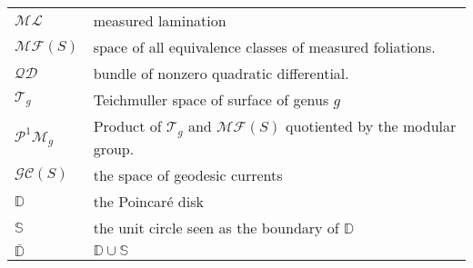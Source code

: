 \begin{tabular}{ll}
  $\mathcal{ML}$ &  measured lamination  \\
  $\mathcal{MF}(S)$ & space of all equivalence classes of measured foliations. \\
  $\mathcal{QD}$ & bundle of nonzero quadratic differential. \\
  $\mathcal{T}_g$ & Teichmuller space of surface of genus $g$ \\
  $\mathcal{P}^1 \mathcal{M}_g$ & Product of $\mathcal{T}_g$  and $\mathcal{MF}(S)$ quotiented by the modular group. \\
$\mathcal{GC}(S)$  & the space of geodesic currents \\
$\mathbb{D}$ & the Poincaré disk \\
$\mathbb{S}$ & the unit circle seen as the boundary of $\mathbb{D}$ \\
$\bar{\mathbb{D}}$ & $\mathbb{D} \cup \mathbb{S}$
\end{tabular}

